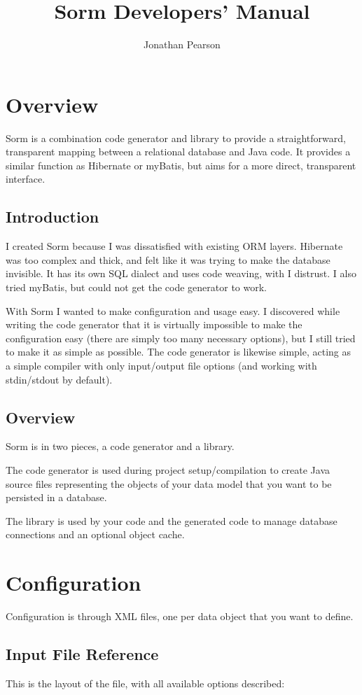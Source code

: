 \documentclass{book}
\author{Jonathan Pearson}
\title{Sorm Developers' Manual}
\begin{document}
\tableofcontents

\chapter{Overview}
Sorm is a combination code generator and library to provide a straightforward,
transparent mapping between a relational database and Java code. It provides a
similar function as Hibernate or myBatis, but aims for a more direct,
transparent interface.

\section{Introduction}
I created Sorm because I was dissatisfied with existing ORM layers. Hibernate
was too complex and thick, and felt like it was trying to make the database
invisible. It has its own SQL dialect and uses code weaving, with I distrust.
I also tried myBatis, but could not get the code generator to work.

With Sorm I wanted to make configuration and usage easy. I discovered while
writing the code generator that it is virtually impossible to make the
configuration easy (there are simply too many necessary options), but I still
tried to make it as simple as possible. The code generator is likewise simple,
acting as a simple compiler with only input/output file options (and working
with stdin/stdout by default).

\section{Overview}
Sorm is in two pieces, a code generator and a library.

The code generator is used during project setup/compilation to create Java
source files representing the objects of your data model that you want to be
persisted in a database.

The library is used by your code and the generated code to manage database
connections and an optional object cache.


\chapter{Configuration}
Configuration is through XML files, one per data object that you want to define.

\section{Input File Reference}
This is the layout of the file, with all available options described:
\end{document}
